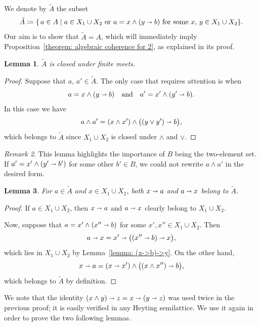 \documentclass[reqno,a4paper]{amsart}
\newtheorem{lemma}{Lemma}[section]
\theoremstyle{remark}
\newtheorem{remark}[lemma]{Remark}
\theoremstyle{definition}
\newcommand{\ojoin}{\cup}  %
\newcommand{\iimplies}{\shortrightarrow}
\begin{document}
We denote by \(\tilde A\) the subset
\[
	\tilde A \coloneq
	\{\, a \in A \mid \text{\(a \in X_1 \ojoin X_2\) or \(a = x \wedge (y \iimplies b)\) for some \(x\), \(y \in X_1 \ojoin X_2\)}\}\text{.}
\]
Our aim is to show that \(\tilde A = A\), which will immediately imply
Proposition~\ref{theorem: algebraic coherence for 2}, as explained in its proof.

\begin{lemma}\label{lemma: meet}
	\(\tilde A\) is closed under finite meets.
\end{lemma}
\begin{proof}
	Suppose that \(a\), \(a' \in \tilde A\). The only case that requires attention is when
	\[
		a = x \wedge (y \iimplies b)
		\quad\text{and}\quad
		a' = x' \wedge (y' \iimplies b).
	\]
	In this case we have
	\[
		a \wedge a' = (x \wedge x') \wedge \bigl((y \vee y')\iimplies b\bigr),
	\]
	which belongs to \(\tilde A\) since \(X_1 \ojoin X_2\) is closed under \(\wedge\) and \(\vee\).
\end{proof}

\begin{remark}
	This lemma highlights the importance of \(B\) being the two-element set.
	If \(a' = x' \wedge (y' \iimplies b')\) for some other \(b' \in B\),
	we could not rewrite \(a \wedge a'\) in the desired form.
\end{remark}


\begin{lemma}\label{lemma x -> a and a->x}
	For \(a \in \tilde A\) and \(x \in X_1 \ojoin X_2\), both \(x \iimplies a\) and \(a \iimplies x\) belong to \(\tilde A\).
\end{lemma}
\begin{proof}
	If \(a \in X_1 \ojoin X_2\), then \(x \iimplies a\) and \(a \iimplies x\) clearly belong to \(X_1 \ojoin X_2\).

	Now, suppose that \(a = x' \wedge (x'' \iimplies b)\) for some \(x',x'' \in X_1 \ojoin X_2\). Then
	\[
		a \iimplies x = x' \iimplies \bigl((x'' \iimplies b)\iimplies x\bigr),
	\]
	which lies in \(X_1 \ojoin X_2\) by Lemma~\ref{lemma: (x->b)->y}. On the other hand,
	\[
		x \iimplies a = (x \iimplies x') \wedge \bigl((x \wedge x'')\iimplies b\bigr),
	\]
	which belongs to \(\tilde A\) by definition.
\end{proof}

We note that the identity \((x \wedge y) \iimplies z = x \iimplies (y \iimplies z)\) was used twice in the previous proof; it is easily verified in any Heyting semilattice. We use it again in order to prove the two following lemmas.
\end{document}

